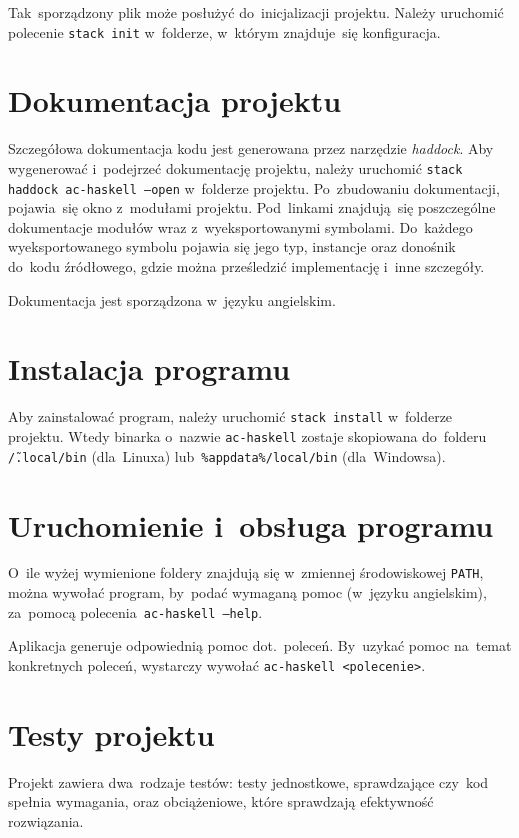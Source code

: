 \documentclass[../../praca.tex]{subfiles}
\begin{document}
Tak~sporządzony plik może posłużyć do~inicjalizacji projektu.
Należy uruchomić polecenie \texttt{stack init} w~folderze,
w~którym znajduje~się konfiguracja.

\section{Dokumentacja projektu}

Szczegółowa dokumentacja kodu jest generowana przez narzędzie \emph{haddock}.
Aby wygenerować i~podejrzeć dokumentację projektu, należy uruchomić \texttt{stack haddock
ac-haskell --open} w~folderze projektu. Po~zbudowaniu dokumentacji, pojawia~się
okno z~modułami projektu. Pod~linkami znajdują~się poszczególne dokumentacje
modułów wraz z~wyeksportowanymi symbolami. Do~każdego wyeksportowanego
symbolu pojawia się jego typ, instancje oraz donośnik do~kodu źródłowego,
gdzie można prześledzić implementację i~inne szczegóły.

Dokumentacja jest sporządzona w~języku angielskim.

\section{Instalacja programu}

Aby zainstalować program, należy uruchomić \texttt{stack install} 
w~folderze projektu. Wtedy binarka o~nazwie \texttt{ac-haskell}
zostaje skopiowana do~folderu \texttt{\~/.local/bin} (dla~Linuxa)
lub~\texttt{\%appdata\%/local/bin} (dla~Windowsa).

\section{Uruchomienie i~obsługa programu}

O~ile wyżej wymienione foldery znajdują się w~zmiennej środowiskowej
\texttt{PATH}, można wywołać program, by~podać wymaganą pomoc (w~języku angielskim),
za~pomocą polecenia~\texttt{ac-haskell --help}.

Aplikacja generuje odpowiednią pomoc dot.~poleceń. By~uzykać pomoc na~temat konkretnych
poleceń, wystarczy wywołać \texttt{ac-haskell <polecenie>}.

\section{Testy projektu}

Projekt zawiera dwa~rodzaje testów: testy jednostkowe, sprawdzające
czy~kod spełnia wymagania, oraz obciążeniowe, które sprawdzają
efektywność rozwiązania.
\end{document}
